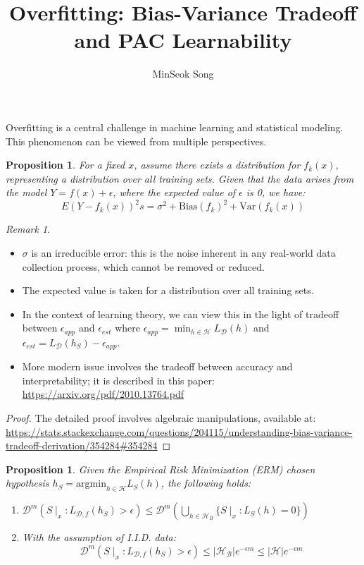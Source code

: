 \documentclass{article}
\newtheorem{proposition}[theorem]{Proposition}
\theoremstyle{remark}
\newtheorem{remark}[example]{Remark}
\begin{document}
\title{Overfitting: Bias-Variance Tradeoff and PAC Learnability}
\author{MinSeok Song}
\date{}
\maketitle
Overfitting is a central challenge in machine learning and statistical modeling. This phenomenon can be viewed from multiple perspectives.
\begin{proposition}
For a fixed $x$, assume there exists a distribution for $f_k(x)$, representing a distribution over all training sets. Given that the data arises from the model $Y=f(x)+\epsilon$, where the expected value of $\epsilon$ is 0, we have:
\[E(Y-f_k(x))^2s = \sigma^2 + \text{Bias}(f_k)^2 + \text{Var}(f_k(x))\]
\end{proposition}
\begin{remark}
\begin{itemize}
\item $\sigma$ is an irreducible error: this is the noise inherent in any real-world data collection process, which cannot be removed or reduced.
\item The expected value is taken for a distribution over all training sets.
\item In the context of learning theory, we can view this in the light of tradeoff between $\epsilon_{app}$ and $\epsilon_{est}$ where $\epsilon_{app}=\min_{h\in\mathcal{H}}L_\mathcal{D}(h)$ and $\epsilon_{est}=L_\mathcal{D}(h_S)-\epsilon_{app}$.
\item More modern issue involves the tradeoff between accuracy and interpretability; it is described in this paper: \url{https://arxiv.org/pdf/2010.13764.pdf} 
\end{itemize}
\end{remark}

\begin{proof}
The detailed proof involves algebraic manipulations, available at:
\url{https://stats.stackexchange.com/questions/204115/understanding-bias-variance-tradeoff-derivation/354284#354284}
\end{proof}

\begin{proposition}
Given the Empirical Risk Minimization (ERM) chosen hypothesis $h_S = \text{argmin}_{h\in\mathcal{H}}L_{S}(h)$, the following holds:
\begin{enumerate}
    \item $\mathcal{D}^m\left(S\mid_x:L_{\mathcal{D}, f}(h_S)>\epsilon\right) \leq \mathcal{D}^m\left(\bigcup_{h\in \mathcal{H}_B}\{S\mid_x:L_S(h)=0\}\right)$
    
    \item With the assumption of I.I.D. data:
    \[\mathcal{D}^m\left(S\mid_x:L_{\mathcal{D}, f}(h_S)>\epsilon\right) \leq \lvert \mathcal{H_B}\rvert e^{-\epsilon m} \leq \lvert \mathcal{H}\rvert e^{-\epsilon m}\]
\end{enumerate}
\end{proposition}
\end{document}
